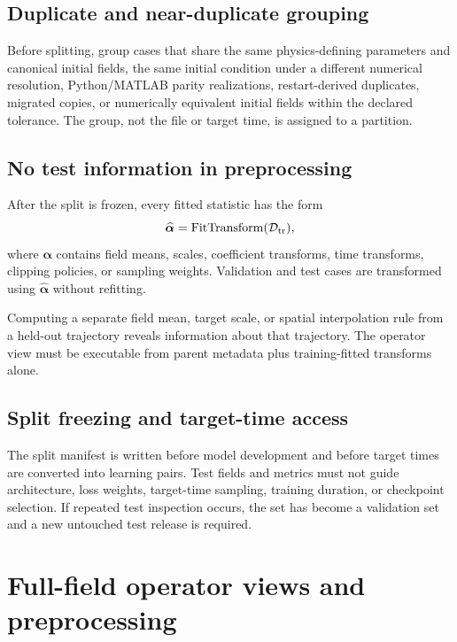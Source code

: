 \documentclass[11pt]{article}
\newcommand{\vect}[1]{\bm{#1}}
\begin{document}
\subsection{Duplicate and near-duplicate grouping}
Before splitting, group cases that share the same physics-defining parameters and canonical initial fields, the same initial condition under a different numerical resolution, Python/MATLAB parity realizations, restart-derived duplicates, migrated copies, or numerically equivalent initial fields within the declared tolerance. The group, not the file or target time, is assigned to a partition.

\subsection{No test information in preprocessing}
After the split is frozen, every fitted statistic has the form
\begin{equation}
\widehat{\vect\alpha}=\operatorname{FitTransform}(\mathcal D_{\rm tr}),
\end{equation}
where $\vect\alpha$ contains field means, scales, coefficient transforms, time transforms, clipping policies, or sampling weights. Validation and test cases are transformed using $\widehat{\vect\alpha}$ without refitting.

\begin{warningbox}
Computing a separate field mean, target scale, or spatial interpolation rule from a held-out trajectory reveals information about that trajectory. The operator view must be executable from parent metadata plus training-fitted transforms alone.
\end{warningbox}

\subsection{Split freezing and target-time access}
The split manifest is written before model development and before target times are converted into learning pairs. Test fields and metrics must not guide architecture, loss weights, target-time sampling, training duration, or checkpoint selection. If repeated test inspection occurs, the set has become a validation set and a new untouched test release is required.

\section{Full-field operator views and preprocessing}
\label{sec:preprocessing}
\end{document}

